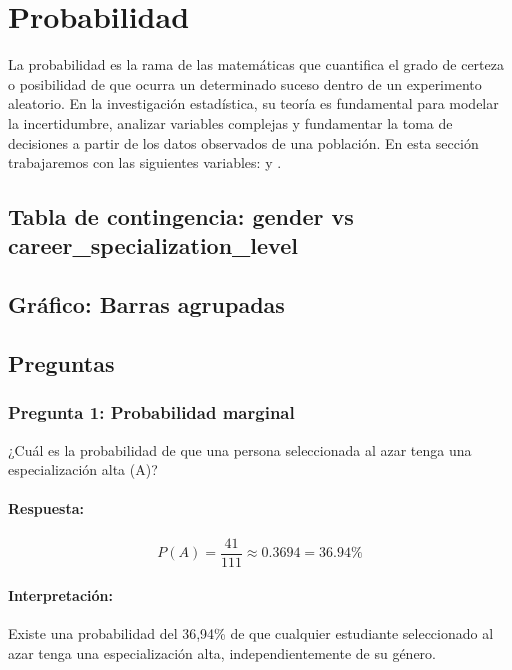 \section{Probabilidad}
La probabilidad es la rama de las matemáticas que cuantifica el grado de certeza o posibilidad de
que ocurra un determinado suceso dentro de un experimento aleatorio. En la investigación
estadística, su teoría es fundamental para modelar la incertidumbre, analizar variables complejas y
fundamentar la toma de decisiones a partir de los datos observados de una población. En esta sección
trabajaremos con las siguientes variables:
 y .

\subsection{Tabla de contingencia: gender vs career\_specialization\_level}


\subsection{Gráfico: Barras agrupadas}



\subsection{Preguntas}

\subsubsection{Pregunta 1: Probabilidad marginal}

¿Cuál es la probabilidad de que una persona seleccionada al azar tenga una especialización alta
(A)?

\paragraph{Respuesta:} 
\[ P(A) = \frac{41}{111} \approx 0.3694 = 36.94\% \]

\paragraph{Interpretación:} Existe una probabilidad del 36,94\% de que cualquier estudiante
seleccionado al azar tenga una especialización alta, independientemente de su género.


